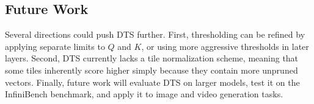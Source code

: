 \subsection{Future Work}

Several directions could push DTS further. First, thresholding can be refined by applying separate limits to $Q$ and $K$, or using more aggressive thresholds in later layers. Second, DTS currently lacks a tile normalization scheme, meaning that some tiles inherently score higher simply because they contain more unpruned vectors. Finally, future work will evaluate DTS on larger models, test it on the InfiniBench benchmark, and apply it to image and video generation tasks.